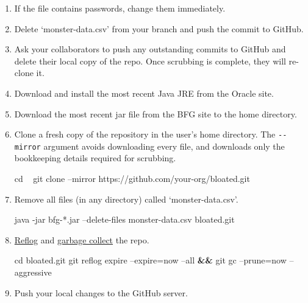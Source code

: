 \documentclass[]{book}
\newenvironment{Shaded}{\begin{snugshade}}{\end{snugshade}}
\newcommand{\BuiltInTok}[1]{#1}
\newcommand{\ExtensionTok}[1]{#1}
\newcommand{\FunctionTok}[1]{\textcolor[rgb]{0.00,0.00,0.00}{#1}}
\newcommand{\KeywordTok}[1]{\textcolor[rgb]{0.13,0.29,0.53}{\textbf{#1}}}
\newcommand{\NormalTok}[1]{#1}
\begin{document}
\begin{enumerate}
\def\labelenumi{\arabic{enumi}.}
\item
  If the file contains passwords, change them immediately.
\item
  Delete `monster-data.csv' from your branch and push the commit to GitHub.
\item
  Ask your collaborators to push any outstanding commits to GitHub and delete their local copy of the repo. Once scrubbing is complete, they will re-clone it.
\item
  Download and install the most recent Java JRE from the Oracle site.
\item
  Download the most recent jar file from the BFG site to the home directory.
\item
  Clone a fresh copy of the repository in the user's home directory. The \texttt{-\/-mirror} argument avoids downloading every file, and downloads only the bookkeeping details required for scrubbing.

\begin{Shaded}
\begin{Highlighting}[]
\BuiltInTok{cd}\NormalTok{ ~}
\FunctionTok{git}\NormalTok{ clone --mirror https://github.com/your-org/bloated.git}
\end{Highlighting}
\end{Shaded}
\item
  Remove all files (in any directory) called `monster-data.csv'.

\begin{Shaded}
\begin{Highlighting}[]
\ExtensionTok{java}\NormalTok{ -jar bfg-*.jar --delete-files monster-data.csv bloated.git}
\end{Highlighting}
\end{Shaded}
\item
  \href{https://git-scm.com/docs/git-reflog}{Reflog} and \href{https://git-scm.com/docs/git-gc}{garbage collect} the repo.

\begin{Shaded}
\begin{Highlighting}[]
\BuiltInTok{cd}\NormalTok{ bloated.git}
\FunctionTok{git}\NormalTok{ reflog expire --expire=now --all }\KeywordTok{&&} \FunctionTok{git}\NormalTok{ gc --prune=now --aggressive}
\end{Highlighting}
\end{Shaded}
\item
  Push your local changes to the GitHub server.


\end{enumerate}
\end{document}
